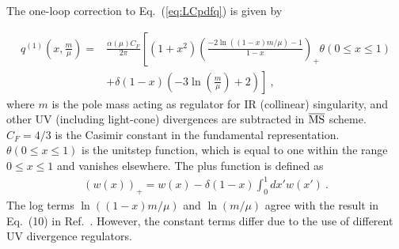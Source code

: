 \documentclass[a4paper,11pt]{article}
\begin{document}
The one-loop correction to Eq.~(\ref{eq:LCpdfq}) is given by

\begin{align}\label{eq:LCpdfq1loopfmtot}
q^{(1)}\left(x, \frac{m}{\mu}\right)
= & \frac{\alpha(\mu) C_F}{2 \pi} \left[ \left(1+x^2\right) \left(\frac{-2\ln \left((1-x) m/\mu\right)-1}{1-x}\right)_{+}\theta (0\leq x\leq 1) \right. \nonumber\\
&\left. + \delta (1-x) \left(-3\ln\left(\frac{m}{\mu}\right)+2\right) \right] \ ,
\end{align}
where $m$ is the pole mass acting as regulator for IR (collinear) singularity, and other UV (including light-cone) divergences are subtracted in $\overline{\rm MS}$ scheme. $C_F=4/3$ is the Casimir constant in the fundamental representation. $\theta(0 \leq x \leq  1)$ is the unitstep function, which is equal to one within the range $0 \leq x \leq 1$ and vanishes elsewhere. The plus function is defined as
\begin{align}\label{eq:pluspdf}
\left(w(x)\right)_{+} = w(x) - \delta(1-x)\int_{0}^{1} d x' w(x') \ . 
\end{align}
The log terms $\ln\left((1-x) m/\mu\right)$ and $\ln\left(m/\mu\right)$ agree with the result in Eq.~(10) in Ref.~\cite{Xiong:2013bka}. However, the constant terms differ due to the use of different UV divergence regulators. 
\end{document}
